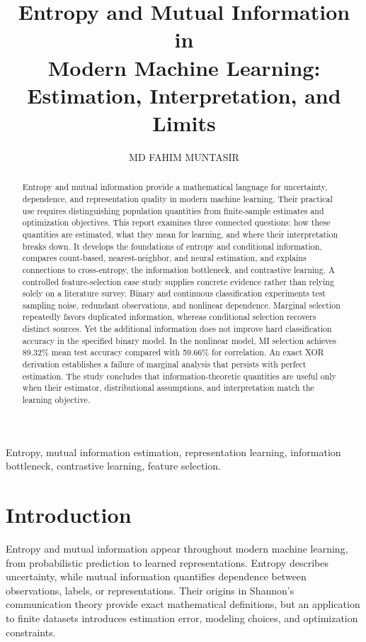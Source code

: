 \documentclass[journal,11pt]{IEEEtran}
\title{Entropy and Mutual Information in\\Modern Machine Learning:\\Estimation, Interpretation, and Limits}
\author{MD FAHIM MUNTASIR}
\begin{document}
\maketitle
\begin{abstract}
Entropy and mutual information provide a mathematical language for uncertainty, dependence, and representation quality in modern machine learning. Their practical use requires distinguishing population quantities from finite-sample estimates and optimization objectives. This report examines three connected questions: how these quantities are estimated, what they mean for learning, and where their interpretation breaks down. It develops the foundations of entropy and conditional information, compares count-based, nearest-neighbor, and neural estimation, and explains connections to cross-entropy, the information bottleneck, and contrastive learning. A controlled feature-selection case study supplies concrete evidence rather than relying solely on a literature survey. Binary and continuous classification experiments test sampling noise, redundant observations, and nonlinear dependence. Marginal selection repeatedly favors duplicated information, whereas conditional selection recovers distinct sources. Yet the additional information does not improve hard classification accuracy in the specified binary model. In the nonlinear model, MI selection achieves 89.32\% mean test accuracy compared with 59.66\% for correlation. An exact XOR derivation establishes a failure of marginal analysis that persists with perfect estimation. The study concludes that information-theoretic quantities are useful only when their estimator, distributional assumptions, and interpretation match the learning objective.
\end{abstract}
\begin{IEEEkeywords}
Entropy, mutual information estimation, representation learning, information bottleneck, contrastive learning, feature selection.
\end{IEEEkeywords}

\section{Introduction}
Entropy and mutual information appear throughout modern machine learning, from probabilistic prediction to learned representations. Entropy describes uncertainty, while mutual information quantifies dependence between observations, labels, or representations. Their origins in Shannon's communication theory \cite{shannon} provide exact mathematical definitions, but an application to finite datasets introduces estimation error, modeling choices, and optimization constraints.
\end{document}
